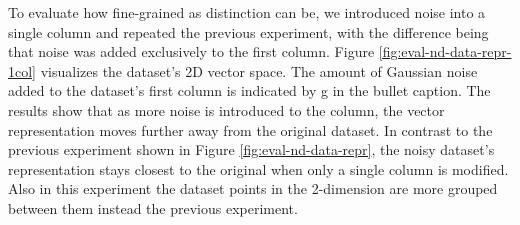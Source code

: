 To evaluate how fine-grained as distinction can be, we introduced noise into a single column and repeated the previous experiment, with the difference being that noise was added exclusively to the first column. Figure \ref{fig:eval-nd-data-repr-1col} visualizes the dataset's 2D vector space. The amount of Gaussian noise added to the dataset's first column is indicated by g in the bullet caption. The results show that as more noise is introduced to the column, the vector representation moves further away from the original dataset. In contrast to the previous experiment shown in Figure \ref{fig:eval-nd-data-repr}, the noisy dataset's representation stays closest to the original when only a single column is modified. Also in this experiment the dataset points in the 2-dimension are more grouped between them instead the previous experiment. 

